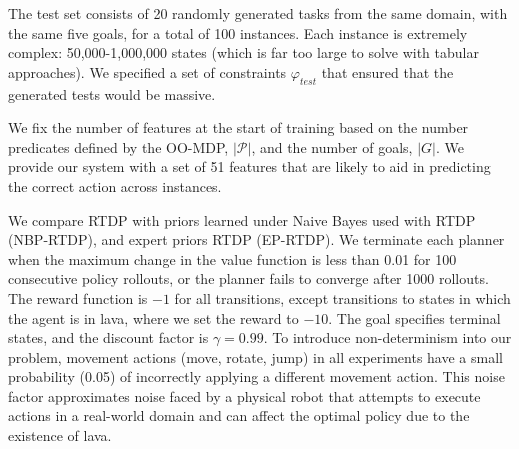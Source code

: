 \documentclass[11pt]{article}
\begin{document}
The test set consists of 20 randomly generated tasks from the same domain, with the same five goals, for a total of 100 instances. Each instance is extremely complex: 50,000-1,000,000 states (which is far too large to solve with tabular approaches). We specified a set of constraints $\varphi_{test}$ that ensured that the generated tests would be massive.

We fix the number of features at the start of training based on the number
predicates defined by the OO-MDP, $|\mathcal{P}|$, and the number of goals, $|G|$.
We provide our system with a set of 51 features that are likely to aid in predicting the correct action across instances.

We compare RTDP with priors learned under Naive Bayes used with RTDP (NBP-RTDP), and expert priors RTDP (EP-RTDP).
We terminate each planner when the maximum change in
the value function is less than 0.01 for 100 consecutive policy
rollouts, or the planner fails to converge after 1000 rollouts.  The
reward function is $-1$ for all transitions, except transitions to
states in which the agent is in lava, where we set the reward to
$-10$. The goal specifies terminal states, and the discount factor is
$\gamma = 0.99$.  To introduce non-determinism into our problem,
movement actions (move, rotate, jump) in all experiments have a small
probability (0.05) of incorrectly applying a different movement
action.  This noise factor approximates noise faced by a physical
robot that attempts to execute actions in a real-world domain and
can affect the optimal policy due to the existence of lava.
\end{document}
